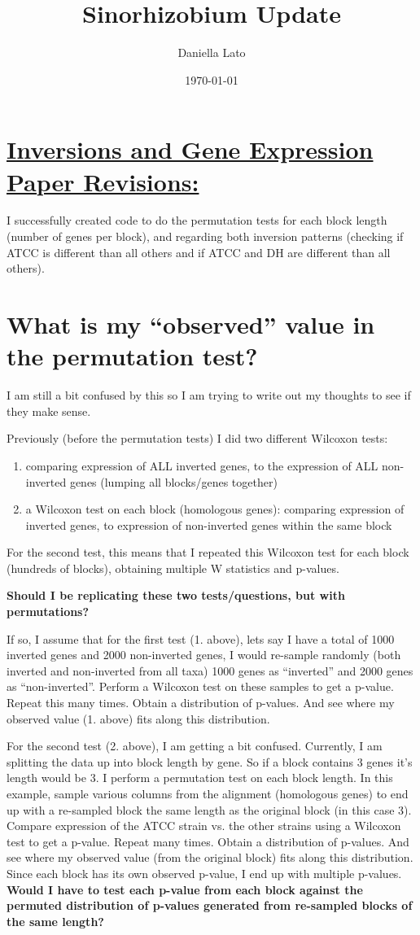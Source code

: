 \documentclass[12pt]{article}
\title{Sinorhizobium Update}
\author{Daniella Lato}
\date{\today}
\begin{document}
\section*{\underline{Inversions and Gene Expression Paper Revisions:}}
I successfully created code to do the permutation tests for each block length (number of genes per block), and regarding both inversion patterns (checking if ATCC is different than all others and if ATCC and DH are different than all others).

\section*{What is my ``observed'' value in the permutation test?}
I am still a bit confused by this so I am trying to write out my thoughts to see if they make sense.

Previously (before the permutation tests) I did two different Wilcoxon tests:
\begin{enumerate}
	\item comparing expression of ALL inverted genes, to the expression of ALL non-inverted genes (lumping all blocks/genes together)
	\item a Wilcoxon test on each block (homologous genes): comparing expression of inverted genes, to expression of non-inverted genes within the same block
\end{enumerate}

For the second test, this means that I repeated this Wilcoxon test for each block (hundreds of blocks), obtaining multiple W statistics and p-values.

\textbf{Should I be replicating these two tests/questions, but with permutations?}

If so, I assume that for the first test (1. above), lets say I have a total of 1000 inverted genes and 2000 non-inverted genes, I would re-sample randomly (both inverted and non-inverted from all taxa) 1000 genes as ``inverted'' and 2000 genes as ``non-inverted''. Perform a Wilcoxon test on these samples to get a p-value. Repeat this many times. Obtain a distribution of p-values. And see where my observed value (1. above) fits along this distribution. 

For the second test (2. above), I am getting a bit confused. Currently, I am splitting the data up into block length by gene. So if a block contains 3 genes it's length would be 3. I perform a permutation test on each block length. In this example, sample various columns from the alignment (homologous genes) to end up with a re-sampled block the same length as the original block (in this case 3). Compare expression of the ATCC strain vs. the other strains using a Wilcoxon test to get a p-value. Repeat many times. Obtain a distribution of p-values. And see where my observed value (from the original block) fits along this distribution. 
Since each block has its own observed p-value, I end up with multiple p-values. \textbf{Would I have to test each p-value from each block against the permuted distribution of p-values generated from re-sampled blocks of the same length?}
\end{document}
